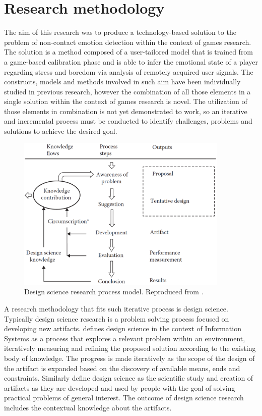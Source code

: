 \chapter{Research methodology}

The aim of this research was to produce a technology-based solution to the problem of non-contact emotion detection within the context of games research. The solution is a method composed of a user-tailored model that is trained from a game-based calibration phase and is able to infer the emotional state of a player regarding stress and boredom via analysis of remotely acquired user signals. The constructs, models and methods involved in such aim have been individually studied in previous research, however the combination of all those elements in a single solution within the context of games research is novel. The utilization of those elements in combination is not yet demonstrated to work, so an iterative and incremental process must be conducted to identify challenges, problems and solutions to achieve the desired goal.

\begin{figure}[h]
    \centering
    \includegraphics[width=0.9\textwidth]{Content/figures/vaishnavi-design-science-process-model.png}
    \caption{Design science research process model. Reproduced from \textcite{vaishnavi2015design}.}
    \label{fig:vaishnavi-design-science-process-model}
\end{figure}

A research methodology that fits such iterative process is design science. Typically design science research is a problem solving process focused on developing new artifacts. \textcite{hevner2004design} defines design science in the context of Information Systems as a process that explores a relevant problem within an environment, iteratively measuring and refining the proposed solution according to the existing body of knowledge. The progress is made iteratively as the scope of the design of the artifact is expanded based on the discovery of available means, ends and constraints. Similarly \textcite{johannesson2014introduction} define design science as the scientific study and creation of artifacts as they are developed and used by people with the goal of solving practical problems of general interest. The outcome of design science research includes the contextual knowledge about the artifacts.

